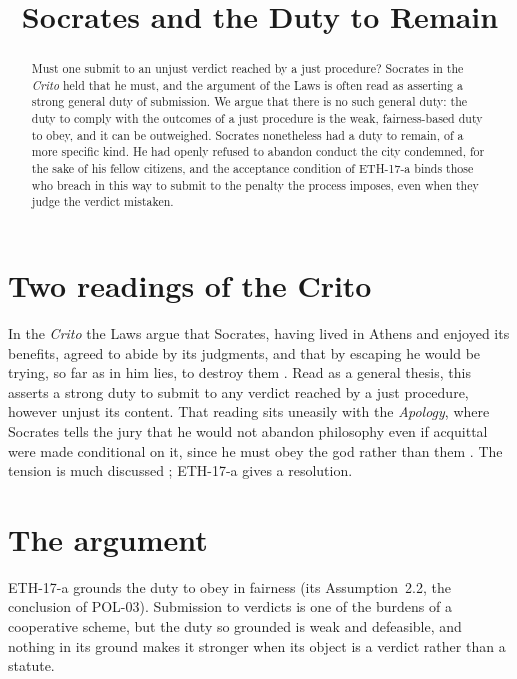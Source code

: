 \documentclass{situationist-preprint}
\title{Socrates and the Duty to Remain}
\begin{document}
\maketitle

\begin{abstract}
Must one submit to an unjust verdict reached by a just procedure? Socrates in the \emph{Crito} held that he must, and the argument of the Laws is often read as asserting a strong general duty of submission. We argue that there is no such general duty: the duty to comply with the outcomes of a just procedure is the weak, fairness-based duty to obey, and it can be outweighed. Socrates nonetheless had a duty to remain, of a more specific kind. He had openly refused to abandon conduct the city condemned, for the sake of his fellow citizens, and the acceptance condition of ETH-17-a binds those who breach in this way to submit to the penalty the process imposes, even when they judge the verdict mistaken.
\end{abstract}

\section{Two readings of the Crito}

In the \emph{Crito} the Laws argue that Socrates, having lived in Athens and enjoyed its benefits, agreed to abide by its judgments, and that by escaping he would be trying, so far as in him lies, to destroy them \citep[50a--54d]{PlatoCrito}. Read as a general thesis, this asserts a strong duty to submit to any verdict reached by a just procedure, however unjust its content. That reading sits uneasily with the \emph{Apology}, where Socrates tells the jury that he would not abandon philosophy even if acquittal were made conditional on it, since he must obey the god rather than them \citep[29c--d]{PlatoApology}. The tension is much discussed \citep{Woozley1979,Kraut1984}; ETH-17-a gives a resolution.

\section{The argument}

ETH-17-a grounds the duty to obey in fairness (its Assumption~2.2, the conclusion of POL-03). Submission to verdicts is one of the burdens of a cooperative scheme, but the duty so grounded is weak and defeasible, and nothing in its ground makes it stronger when its object is a verdict rather than a statute.
\end{document}
